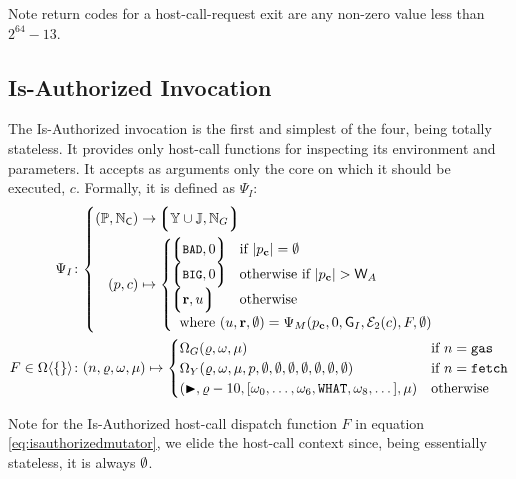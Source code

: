 Note return codes for a host-call-request exit are any non-zero value less than $2^{64} - 13$.

\subsection{Is-Authorized Invocation}\label{sec:isauthorizedinvocation}

\newcommand*{\wpX}{p}

The Is-Authorized invocation is the first and simplest of the four, being totally stateless. It provides only host-call functions for inspecting its environment and parameters. It accepts as arguments only the core on which it should be executed, $c$. Formally, it is defined as $\Psi_I$:
\begin{align}
  \Psi_I &\colon \left\{\begin{aligned}
    (\mathbb{P}, \N_\mathsf{C}) &\to \tuple{\Y \cup \mathbb{J}, \N_G} \\
    (\wpX, c) &\mapsto \begin{cases}
      \tup{\token{BAD}, 0} &\when |\wpX_\mathbf{c}| = \none \\
      \tup{\token{BIG}, 0} &\otherwhen |\wpX_\mathbf{c}| > \mathsf{W}_A \\
      \tup{\mathbf{r}, u} &\otherwise \\
      \multicolumn{2}{l}{\where (u, \mathbf{r}, \none) = \Psi_M(\wpX_\mathbf{c}, 0, \mathsf{G}_I, \se_2(c), F, \none)}\\
    \end{cases}\\
  \end{aligned}\right. \\
  \label{eq:isauthorizedmutator}F \in \Omega\ang{\{\}} &\colon
    (n, \gascounter, \registers, \memory) \mapsto \begin{cases}
      \Omega_G(\gascounter, \registers, \memory) &\when n = \mathtt{gas} \\
      \Omega_Y(\gascounter, \registers, \memory, \wpX, \none, \none, \none, \none, \none, \none, \none) &\when n = \mathtt{fetch} \\
      (\continue, \gascounter - 10, [\registers_0, \dots, \registers_6, \mathtt{WHAT}, \registers_8, \dots], \memory) &\otherwise
    \end{cases}
\end{align}

Note for the Is-Authorized host-call dispatch function $F$ in equation \ref{eq:isauthorizedmutator}, we elide the host-call context since, being essentially stateless, it is always $\emptyset$.


